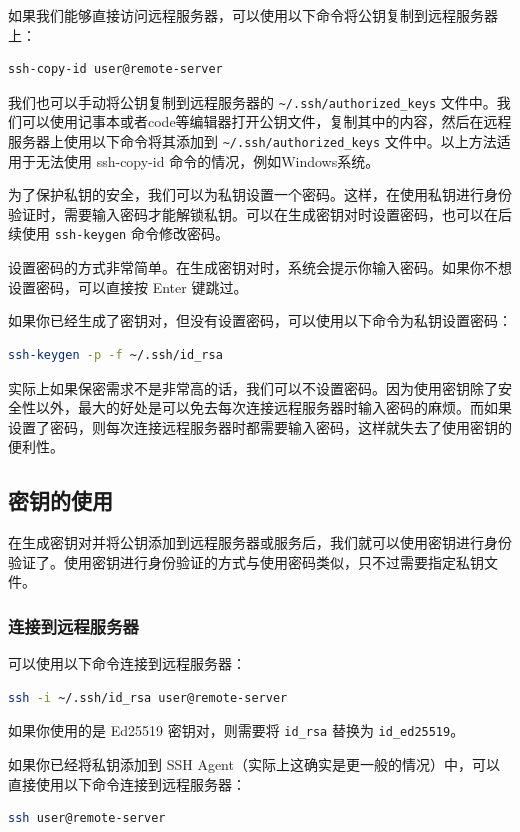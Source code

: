 \documentclass[../main.tex]{subfiles}
\begin{document}
如果我们能够直接访问远程服务器，可以使用以下命令将公钥复制到远程服务器上：
\begin{lstlisting}[language=bash]
ssh-copy-id user@remote-server
\end{lstlisting}

我们也可以手动将公钥复制到远程服务器的 \texttt{\textasciitilde/.ssh/authorized\_keys} 文件中。我们可以使用记事本或者code等编辑器打开公钥文件，复制其中的内容，然后在远程服务器上使用以下命令将其添加到 \texttt{\textasciitilde/.ssh/authorized\_keys} 文件中。以上方法适用于无法使用 ssh-copy-id 命令的情况，例如Windows系统。

为了保护私钥的安全，我们可以为私钥设置一个密码。这样，在使用私钥进行身份验证时，需要输入密码才能解锁私钥。可以在生成密钥对时设置密码，也可以在后续使用 \texttt{ssh-keygen} 命令修改密码。

设置密码的方式非常简单。在生成密钥对时，系统会提示你输入密码。如果你不想设置密码，可以直接按 Enter 键跳过。

如果你已经生成了密钥对，但没有设置密码，可以使用以下命令为私钥设置密码：
\begin{lstlisting}[language=bash]
ssh-keygen -p -f ~/.ssh/id_rsa
\end{lstlisting}

实际上如果保密需求不是非常高的话，我们可以不设置密码。因为使用密钥除了安全性以外，最大的好处是可以免去每次连接远程服务器时输入密码的麻烦。而如果设置了密码，则每次连接远程服务器时都需要输入密码，这样就失去了使用密钥的便利性。

\subsection{密钥的使用}

在生成密钥对并将公钥添加到远程服务器或服务后，我们就可以使用密钥进行身份验证了。使用密钥进行身份验证的方式与使用密码类似，只不过需要指定私钥文件。

\subsubsection{连接到远程服务器}

可以使用以下命令连接到远程服务器：
\begin{lstlisting}[language=bash]
ssh -i ~/.ssh/id_rsa user@remote-server
\end{lstlisting}
如果你使用的是 Ed25519 密钥对，则需要将 \texttt{id\_rsa} 替换为 \texttt{id\_ed25519}。

如果你已经将私钥添加到 SSH Agent（实际上这确实是更一般的情况）中，可以直接使用以下命令连接到远程服务器：
\begin{lstlisting}[language=bash]
ssh user@remote-server
\end{lstlisting}
\end{document}
